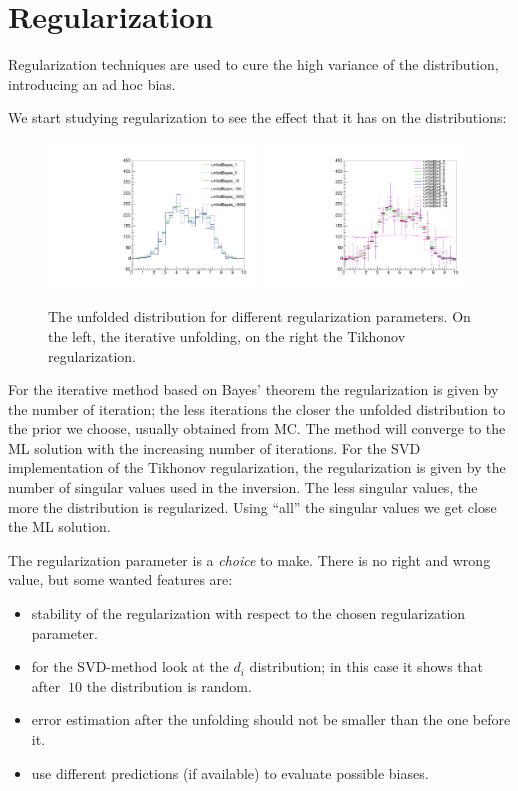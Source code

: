 \documentclass[a4paper,11pt]{article}
\begin{document}
\FloatBarrier
\section{Regularization}
Regularization techniques are used to cure the high variance of the distribution, introducing an ad hoc bias. 

We start studying regularization to see the effect that it has on the distributions:
\begin{figure}[H]
	\centering
	\includegraphics[width=0.49\textwidth]{figs/unfold-bayes-reg.pdf}
	\includegraphics[width=0.49\textwidth]{figs/unfold-svd-reg.pdf}
	\caption{ \label{fig:sol:reg} The unfolded distribution for different regularization parameters. On the left, the iterative unfolding, on the right the Tikhonov regularization. }
\end{figure}

For the iterative method based on Bayes' theorem the regularization is given by the number of iteration; the less iterations the closer the unfolded distribution to the prior we choose, usually obtained from \gls{MC}. The method will converge to the \gls{ML} solution with the increasing number of iterations.
For the \gls{SVD} implementation of the Tikhonov regularization, the regularization is given by the number of singular values used in the inversion. The less singular values, the more the distribution is regularized. Using ``all'' the singular values we get close the \gls{ML} solution.

The regularization parameter is a \emph{choice} to make. 
There is no right and wrong value, but some wanted features are:
\begin{itemize}
	\item stability of the regularization with respect to the chosen regularization parameter.
	\item for the \gls{SVD}-method look at the $d_i$ distribution; in this case it shows that after $~10$ the distribution is random.
	\item error estimation after the unfolding should not be smaller than the one before it.
	\item use different predictions (if available) to evaluate possible biases.
\end{itemize}
\end{document}
